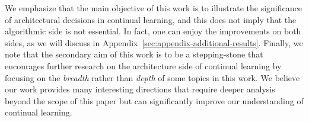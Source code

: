 We emphasize that the main objective of this work is to illustrate the significance of architectural decisions in continual learning, and this does not imply that the algorithmic side is not essential. In fact, one can enjoy the improvements on both sides, as we will discuss in Appendix~\ref{sec:appendix-additional-results}. Finally, we note that the secondary aim of this work is to be a stepping-stone that encourages further research on the architecture side of continual learning by focusing on the \emph{breadth} rather than \emph{depth} of some topics in this work. We believe our work provides many interesting directions that require deeper analysis beyond the scope of this paper but can significantly improve our understanding of continual learning.
